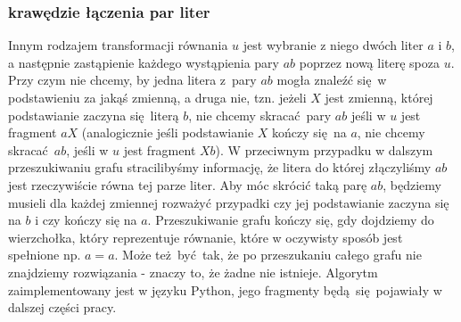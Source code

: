 \documentclass[leqno, 12pt]{article}
\begin{document}
\subsubsection*{krawędzie łączenia par liter}
Innym rodzajem transformacji równania $u$ jest wybranie z niego dwóch liter $a$ i $b$, a następnie zastąpienie każdego wystąpienia pary $ab$ poprzez nową literę spoza $u$.\newline \newline
Przy czym nie chcemy, by jedna litera z pary $ab$ mogła znaleźć się w podstawieniu za jakąś zmienną, a druga nie, tzn. jeżeli $X$ jest zmienną, której podstawianie zaczyna się literą $b$, nie chcemy skracać pary $ab$ jeśli w $u$ jest fragment $aX$ (analogicznie jeśli podstawianie $X$ kończy się na $a$, nie chcemy skracać $ab$, jeśli w $u$ jest fragment $Xb$). W przeciwnym przypadku w dalszym przeszukiwaniu grafu stracilibyśmy informację, że litera do której złączyliśmy $ab$ jest rzeczywiście równa tej parze liter. Aby móc skrócić taką parę $ab$, będziemy musieli dla każdej zmiennej rozważyć przypadki czy jej podstawianie zaczyna się na $b$ i czy kończy się na $a$.
\newline\newline\newline
Przeszukiwanie grafu kończy się, gdy dojdziemy do wierzchołka, który reprezentuje równanie, które w oczywisty sposób jest spełnione np. $a=a$. Może też być tak, że po przeszukaniu całego grafu nie znajdziemy rozwiązania - znaczy to, że żadne nie istnieje.\newline
Algorytm zaimplementowany jest w języku Python, jego fragmenty będą się pojawiały w dalszej części pracy.
\end{document}

